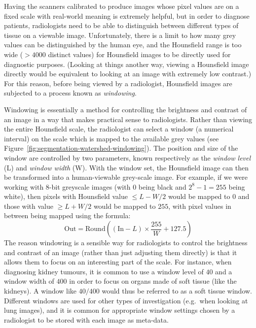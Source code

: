 
Having the scanners calibrated to produce images whose pixel values are on a fixed scale with real-world meaning is extremely helpful, but in order to diagnose patients, radiologists need to be able to distinguish between different types of tissue on a viewable image. Unfortunately, there is a limit to how many grey values can be distinguished by the human eye, and the Hounsfield range is too wide ($> 4000$ distinct values) for Hounsfield images to be directly used for diagnostic purposes. (Looking at things another way, viewing a Hounsfield image directly would be equivalent to looking at an image with extremely low contrast.) For this reason, before being viewed by a radiologist, Hounsfield images are subjected to a process known as \emph{windowing}.

Windowing is essentially a method for controlling the brightness and contrast of an image in a way that makes practical sense to radiologists. Rather than viewing the entire Hounsfield scale, the radiologist can select a window (a numerical interval) on the scale which is mapped to the available grey values (see Figure~\ref{fig:segmentation-watershed-windowing}). The position and size of the window are controlled by two parameters, known respectively as the \emph{window level} (L) and \emph{window width} (W). With the window set, the Hounsfield image can then be transformed into a human-viewable grey-scale image. For example, if we were working with 8-bit greyscale images (with $0$ being black and $2^8 - 1 = 255$ being white), then pixels with Hounsfield value $\le L - W/2$ would be mapped to $0$ and those with value $\ge L + W/2$ would be mapped to $255$, with pixel values in between being mapped using the formula:
%
\[
\mbox{Out} = \mbox{Round}\left( (\mbox{In} - L) \times \frac{255}{W} + 127.5 \right)
\]
%
The reason windowing is a sensible way for radiologists to control the brightness and contrast of an image (rather than just adjusting them directly) is that it allows them to focus on an interesting part of the scale. For instance, when diagnosing kidney tumours, it is common to use a window level of $40$ and a window width of $400$ in order to focus on organs made of soft tissue (like the kidneys). A window like $40/400$ would thus be referred to as a soft tissue window. Different windows are used for other types of investigation (e.g.~when looking at lung images), and it is common for appropriate window settings chosen by a radiologist to be stored with each image as meta-data.


